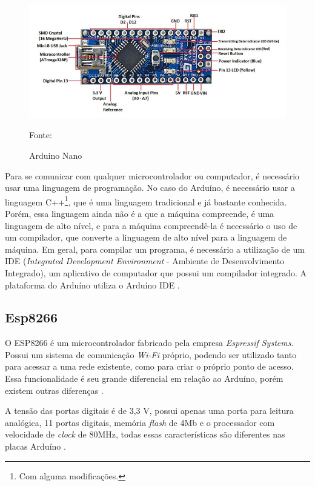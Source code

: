 \begin{figure}[h]
	\centering
	\includegraphics[keepaspectratio=true,scale=0.77
	]{figuras/arduino_nano.png}
	\caption{ Arduino Nano }
	Fonte: \cite{john2018}
	\label{arduino}	
\end{figure}

Para se comunicar com qualquer microcontrolador ou computador, é necessário usar uma linguagem de programação. No caso do Arduíno, é necessário usar a linguagem C++\footnote{Com alguma modificações.}, que é uma linguagem tradicional e já bastante conhecida. Porém, essa linguagem ainda não é a que a máquina compreende, é uma linguagem de alto nível, e para a máquina compreendê-la é necessário o uso de um compilador, que converte a linguagem de alto nível para a linguagem de máquina. Em geral, para compilar um programa, é necessário a utilização de um IDE (\textit{Integrated Development Environment} - Ambiente de Desenvolvimento Integrado), um aplicativo de computador que possui um compilador integrado. A plataforma do Arduíno utiliza o Arduíno IDE \cite{chavier2016}. 

\subsection{Esp8266}

O ESP8266 é  um microcontrolador  fabricado pela empresa \textit{Espressif Systems}. Possui um sistema de comunicação \textit{Wi-Fi }próprio, podendo ser utilizado tanto para acessar a uma rede existente, como para criar o próprio ponto de acesso.  Essa funcionalidade é seu grande diferencial em relação ao Arduíno, porém existem outras diferenças \cite{oliveira2017}. 

A tensão das portas digitais é de 3,3 V, possui apenas uma porta para leitura analógica, 11 portas digitais, memória \textit{flash} de 4Mb e o processador com velocidade de \textit{clock} de 80MHz, todas essas características são diferentes nas placas Arduíno \cite{wemos2017}.

